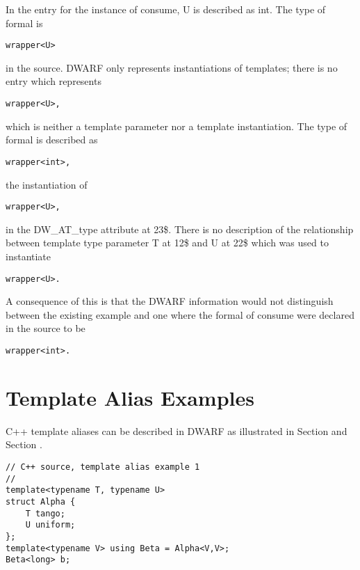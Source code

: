 In the  entry for the instance of consume,
U is described as 
int. 
The type of formal is 
\begin{alltt}
wrapper<U>
\end{alltt}
 in
the source. DWARF only represents instantiations of templates;
there is no entry which represents 
\begin{alltt}
wrapper<U>, 
\end{alltt}
which is neither
a template parameter nor a template instantiation. The type
of formal is described as 
\begin{alltt}
wrapper<int>, 
\end{alltt}
the instantiation of
\begin{alltt}
wrapper<U>, 
\end{alltt}
in the DW\-\_AT\-\_type attribute at 
23\$. 
There is no
description of the relationship between template type parameter
T at 12\$ and U at 
22\$ which was used to instantiate 
\begin{alltt}
wrapper<U>.
\end{alltt}

A consequence of this is that the DWARF information would
not distinguish between the existing example and one where
the formal of consume were declared in the source to be
\begin{alltt}
wrapper<int>.
\end{alltt}

\section{Template Alias Examples}
\label{app:templatealiasexample}

C++ template aliases can be described in DWARF as illustrated in 
Section 
and 
Section .


\begin{lstlisting}
// C++ source, template alias example 1
//
template<typename T, typename U>
struct Alpha {
    T tango;
    U uniform;
};
template<typename V> using Beta = Alpha<V,V>;
Beta<long> b;
\end{lstlisting}


